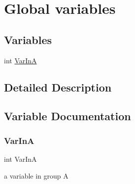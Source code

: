 \hypertarget{group__Variables}{}\section{Global variables}
\label{group__Variables}
\subsection*{Variables}
\begin{DoxyCompactItemize}
\item 
int \hyperlink{group__Variables_ga3a67509a82a3d687246323750e1d305d}{Var\+InA}
\end{DoxyCompactItemize}


\subsection{Detailed Description}


\subsection{Variable Documentation}
\mbox{\label{group__Variables_ga3a67509a82a3d687246323750e1d305d}} 
\subsubsection{\texorpdfstring{Var\+InA}{VarInA}}
{\footnotesize\ttfamily int Var\+InA}

a variable in group A 